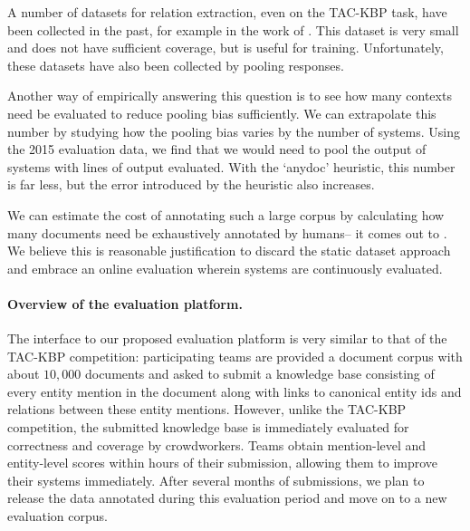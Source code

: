 A number of datasets for relation extraction, even on the TAC-KBP task, have been collected in the past, for example in the work of \citet{angeli2014combining}.
This dataset is very small and does not have sufficient coverage, but is useful for training.
Unfortunately, these datasets have also been collected by pooling responses.

Another way of empirically answering this question is to see how many contexts need be evaluated to reduce pooling bias sufficiently. We can extrapolate this number by studying how the pooling bias varies by the number of systems.
Using the 2015 evaluation data, we find that we would need to pool the output of  systems with  lines of output evaluated.
With the `anydoc' heuristic, this number is far less, but the error introduced by the heuristic also increases.

We can estimate the cost of annotating such a large corpus by calculating how many documents need be exhaustively annotated by humans-- it comes out to . 
We believe this is reasonable justification to discard the static dataset approach and embrace an online evaluation wherein systems are continuously evaluated.

\paragraph{Overview of the evaluation platform.}
The interface to our proposed evaluation platform is very similar to that of the TAC-KBP competition:
  participating teams are provided a document corpus with about $10,000$ documents
  and asked to submit a knowledge base consisting of every entity mention in the document along with links to canonical entity ids and relations between these entity mentions.
However, unlike the TAC-KBP competition, the submitted knowledge base is immediately evaluated for correctness and coverage by crowdworkers.
Teams obtain mention-level and entity-level scores within hours of their submission, allowing them to improve their systems immediately.
After several months of submissions, we plan to release the data annotated during this evaluation period and move on to a new evaluation corpus. 

